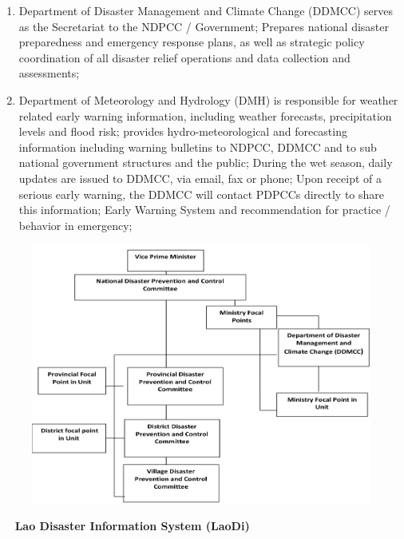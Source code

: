 \begin{enumerate}
\begin{enumerate}

\item Department of Disaster Management and Climate Change (DDMCC) serves as the Secretariat to the NDPCC / Government; Prepares national disaster preparedness and emergency response plans, as well as strategic policy coordination of all disaster relief operations and data collection and assessments; 
\item Department of Meteorology and Hydrology (DMH) is responsible for weather related early warning information, including weather forecasts, precipitation levels and flood risk; provides hydro-meteorological and forecasting information including warning bulletins to NDPCC, DDMCC and to sub national government structures and the public; During the wet season, daily updates are issued to DDMCC, via email, fax or phone; Upon receipt of a serious early warning, the DDMCC will contact PDPCCs directly to share this information; Early Warning System and recommendation for practice / behavior in emergency; 

\end{enumerate}
\end{enumerate}

\begin{figure}[H]
\begin{center}
\includegraphics[width = \linewidth]{Figures/laopdr.png}
\end{center}
\end{figure}
   
{\flushleft \large \bfseries Lao Disaster Information System (LaoDi)}

